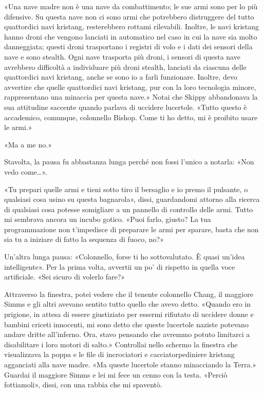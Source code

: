 «Una nave madre non è una nave da combattimento; le sue armi sono per lo
più difensive. Su questa nave non ci sono armi che potrebbero
distruggere del tutto quattordici navi kristang, resterebbero rottami
rilevabili. Inoltre, le navi kristang hanno droni che vengono lanciati
in automatico nel caso in cui la nave sia molto danneggiata; questi
droni trasportano i registri di volo e i dati dei sensori della nave e
sono stealth. Ogni nave trasporta più droni, i sensori di questa nave
avrebbero difficoltà a individuare più droni stealth, lanciati da
ciascuna delle quattordici navi kristang, anche se sono io a farli
funzionare. Inoltre, devo avvertire che quelle quattordici navi
kristang, pur con la loro tecnologia minore, rappresentano una minaccia
per questa nave.» Notai che Skippy abbandonava la sua attitudine
saccente quando parlava di uccidere lucertole. «Tutto questo è
accademico, comunque, colonnello Bishop. Come ti ho detto, mi è proibito
usare le armi.»

«Ma a me no.»

Stavolta, la pausa fu abbastanza lunga perché non fossi l'unico a
notarla: «Non vedo come\ldots».

«Tu prepari quelle armi e tieni sotto tiro il bersaglio e io premo il
pulsante, o qualsiasi cosa usino su questa bagnarola», dissi,
guardandomi attorno alla ricerca di qualsiasi cosa potesse somigliare a
un pannello di controllo delle armi. Tutto mi sembrava ancora un incubo
gotico. «Puoi farlo, giusto? La tua programmazione non t'impedisce di
preparare le armi per sparare, basta che non sia tu a iniziare di fatto
la sequenza di fuoco, no?»

Un'altra lunga pausa: «Colonnello, forse ti ho sottovalutato. È quasi
un'idea intelligente». Per la prima volta, avvertii un po' di rispetto
in quella voce artificiale. «Sei sicuro di volerlo fare?»

Attraverso la finestra, potei vedere che il tenente colonnello Chang, il
maggiore Simms e gli altri avevano sentito tutto quello che avevo detto.
«Quando ero in prigione, in attesa di essere giustiziato per essermi
rifiutato di uccidere donne e bambini criceti innocenti, mi sono detto
che queste lucertole naziste potevano andare dritte all'inferno. Ora,
stavo pensando che avremmo potuto limitarci a disabilitare i loro motori
di salto.» Controllai nello schermo la finestra che visualizzava la
poppa e le file di incrociatori e cacciatorpediniere kristang agganciati
alla nave madre. «Ma queste lucertole stanno minacciando la Terra.»
Guardai il maggiore Simms e lei mi fece un cenno con la testa. «Perciò
fottiamoli», dissi, con una rabbia che mi spaventò.

